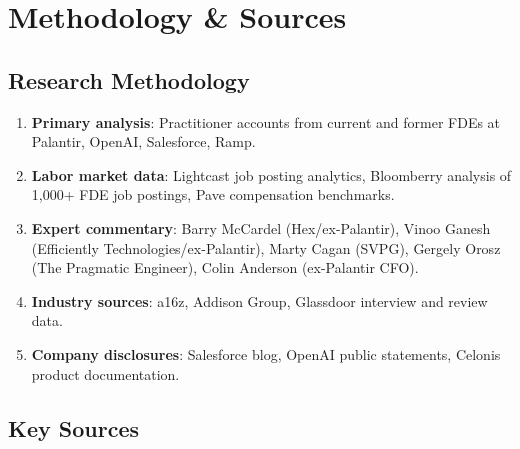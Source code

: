 \vspace{12pt}

\section{Methodology \& Sources}

\subsection{Research Methodology}

\begin{enumerate}
    \item \textbf{Primary analysis}: Practitioner accounts from current
        and former FDEs at Palantir, OpenAI, Salesforce, Ramp.
    \item \textbf{Labor market data}: Lightcast job posting analytics,
        Bloomberry analysis of 1,000+ FDE job postings, Pave
        compensation benchmarks.
    \item \textbf{Expert commentary}: Barry McCardel (Hex/ex-Palantir),
        Vinoo Ganesh (Efficiently Technologies/ex-Palantir), Marty Cagan
        (SVPG), Gergely Orosz (The Pragmatic Engineer), Colin Anderson
        (ex-Palantir CFO).
    \item \textbf{Industry sources}: a16z, Addison Group, Glassdoor
        interview and review data.
    \item \textbf{Company disclosures}: Salesforce blog, OpenAI public
        statements, Celonis product documentation.
\end{enumerate}

\subsection{Key Sources}

